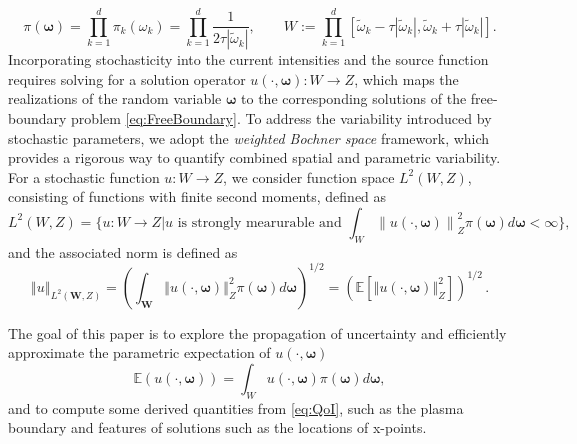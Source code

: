 %
\begin{equation}
\label{eq:ParameterSpace}
 \pi \left(\boldsymbol{\omega}\right)=\prod_{k=1}^{d} \pi_k\left(\omega_{k}\right)=\prod_{k=1}^{d} \frac{1}{2\tau |\widetilde{\omega}_k|}, \qquad  
    W := \prod_{k=1}^{d}\left[\widetilde{\omega}_k-\tau \left\vert \widetilde{\omega}_k\right\vert,\widetilde{\omega}_k+\tau \left\vert \widetilde{\omega}_k \right\vert\right].
\end{equation}
%
Incorporating stochasticity into the current intensities and the source function requires solving for a solution operator $u(\cdot, \boldsymbol{\omega}): W \to Z$, which maps the realizations of the random variable $\boldsymbol \omega$ to the corresponding solutions of the free-boundary problem \eqref{eq:FreeBoundary}. To address the variability introduced by stochastic parameters, we adopt the {\it weighted Bochner space} framework, which provides a rigorous way to quantify combined spatial and parametric variability. For a stochastic function $u: W\to Z$, we consider function space $L^2(W,Z)$, consisting of functions with finite second moments, defined as
%
\[
L^2(W,Z) = \{u:W\rightarrow Z\big\vert u \text{ is strongly mearurable and }\int_{W}\left\|u(\cdot,\boldsymbol{\omega})\right\|_{Z}^2\pi(\boldsymbol{\omega})d\boldsymbol{\omega}<\infty\},
\]
%
and the associated norm is defined as
\[
\left\Vert u \right\Vert_{L^2(\boldsymbol W,Z)} =
    \left(\int_{\boldsymbol W} \left\Vert u(\cdot,\boldsymbol{\omega})  \right\Vert_{Z}^2 \pi(\boldsymbol{\omega})d\boldsymbol{\omega} \right)^{1/2} = \left(\mathbb{E}\left[\left\Vert u(\cdot,\boldsymbol{\omega})  \right\Vert_{Z}^2\right]\right)^{1/2}\,. 
\]

The goal of this paper is to explore the propagation of uncertainty and efficiently approximate the parametric expectation of $u(\cdot,\boldsymbol \omega)$
%
 \begin{equation}
 \label{eq:QoI}
      \mathbb{E}\left(u(\cdot,\boldsymbol \omega)\right)=\int_W u(\cdot,\boldsymbol{\omega})\pi(\boldsymbol\omega)d\boldsymbol{\omega},
 \end{equation}
%
and to compute some derived quantities from \eqref{eq:QoI}, such as the plasma boundary and features of solutions such as the locations of x-points. 


